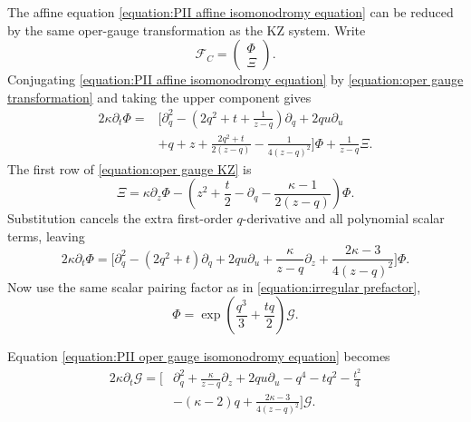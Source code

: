 \documentclass[a4paper,11pt]{article}
\newcommand{\cF}{\mathcal{F}}
\numberwithin{equation}{section}
\begin{document}
\vspace{2 mm}

The affine equation \eqref{equation:PII affine isomonodromy equation} can be reduced by the same
oper-gauge transformation as the KZ system.  Write
\begin{equation}
	\cF_{C}=
	\begin{pmatrix}
		\Phi\\
		\Xi
	\end{pmatrix}.
\end{equation}
Conjugating \eqref{equation:PII affine isomonodromy equation} by
\eqref{equation:oper gauge transformation} and taking the upper component gives
\begin{equation}
	\begin{aligned}
		2\kappa\partial_{t}\Phi
		={}&
		\Bigg[
		\partial_{q}^{2}
		-\left(
		2q^{2}+t+\frac{1}{z-q}
		\right)\partial_{q}
		+2qu\partial_{u}
		\\
		&
		+q+z
		+\frac{2q^{2}+t}{2(z-q)}
		-\frac{1}{4(z-q)^{2}}
		\Bigg]\Phi
		+\frac{1}{z-q}\Xi.
	\end{aligned}
\end{equation}
The first row of \eqref{equation:oper gauge KZ} is
\begin{equation}
	\Xi
	=
	\kappa\partial_{z}\Phi
	-
	\left(
	z^{2}+\frac{t}{2}
	-\partial_{q}
	-\frac{\kappa-1}{2(z-q)}
	\right)\Phi.
\end{equation}
Substitution cancels the extra first-order $q$-derivative and all polynomial scalar terms,
leaving
\begin{equation}
	\label{equation:PII oper gauge isomonodromy equation}
		2\kappa\partial_{t}\Phi
		=
		\Bigg[
		\partial_{q}^{2}
		-\left(2q^{2}+t\right)\partial_{q}
		+2qu\partial_{u}
		+\frac{\kappa}{z-q}\partial_{z}
		+\frac{2\kappa-3}{4(z-q)^{2}}
		\Bigg]\Phi.
\end{equation}
Now use the same scalar pairing factor as in
\eqref{equation:irregular prefactor},
\begin{equation}
	\Phi
	=
	\exp\left(\frac{q^{3}}{3}+\frac{tq}{2}\right)\mathcal{G}.
\end{equation}

Equation \eqref{equation:PII oper gauge isomonodromy equation} becomes
\begin{equation}
	\label{equation:PII scalar isomonodromy equation}
	\begin{aligned}
		2\kappa\partial_{t}\mathcal{G}
		=
		\Bigg[
		&\partial_{q}^{2}
		+\frac{\kappa}{z-q}\partial_{z}
		+2qu\partial_{u}
		-q^{4}-tq^{2}-\frac{t^{2}}{4}
		\\
		&
		-(\kappa-2)q
		+\frac{2\kappa-3}{4(z-q)^{2}}
		\Bigg]\mathcal{G}.
	\end{aligned}
\end{equation}
\end{document}
